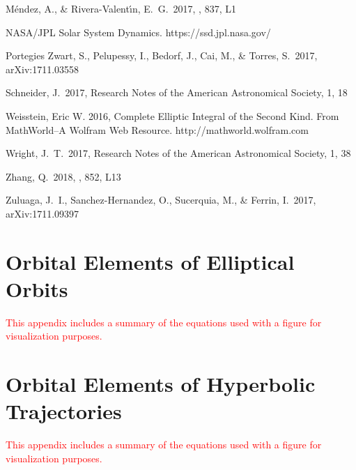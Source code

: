 \documentclass[a4paper,fleqn,usenatbib]{mnras}
\newcommand{\fix}{\textcolor{red}}
\begin{document}
\begin{thebibliography}{99}
 M{\'e}ndez, A., \& Rivera-Valent{\'{\i}}n, E.~G.\ 2017, \apjl, 837, L1 

 NASA/JPL Solar System Dynamics. https://ssd.jpl.nasa.gov/

 Portegies Zwart, S., Pelupessy, I., Bedorf, J., Cai, M., \& Torres, S.\ 2017, arXiv:1711.03558

 Schneider, J.\ 2017, Research Notes of the American Astronomical Society, 1, 18

 Weisstein, Eric W. 2016, Complete Elliptic Integral of the Second Kind. From MathWorld--A Wolfram Web Resource. http://mathworld.wolfram.com

 Wright, J.~T.\ 2017, Research Notes of the American Astronomical Society, 1, 38 

 Zhang, Q.\ 2018, \apjl, 852, L13

 Zuluaga, J.~I., Sanchez-Hernandez, O., Sucerquia, M., \& Ferrin, I.\ 2017, arXiv:1711.09397

\end{thebibliography}



\appendix

\section{Orbital Elements of Elliptical Orbits}

\fix{This appendix includes a summary of the equations used with a figure for visualization purposes.}

\section{Orbital Elements of Hyperbolic Trajectories}

\fix{This appendix includes a summary of the equations used with a figure for visualization purposes.}


\bsp	%
\label{lastpage}
\end{document}

